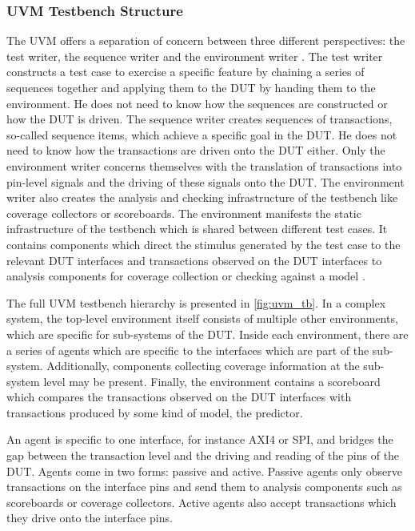 \documentclass[12pt]{report}
\begin{document}
\subsubsection{UVM Testbench Structure} %

The UVM offers a separation of concern between three different perspectives: the test writer, the sequence writer and
the environment writer \cite{sutherland2015uvm}. The test writer constructs a test case to exercise a specific
feature by chaining a series of sequences together and applying them to the DUT by handing them to the environment.
He does not need to know how the sequences are constructed or how the DUT is driven. The sequence writer creates
sequences of transactions, so-called sequence items, which achieve a specific goal in the DUT. He does not need to
know how the transactions are
driven onto the DUT either. Only the environment writer concerns themselves with the translation of transactions into
pin-level signals and the driving of these signals onto the DUT. The environment writer also creates the analysis and
checking infrastructure of the testbench like coverage collectors or scoreboards. The environment manifests the
static infrastructure of the testbench which is shared between different test cases. It contains components which
direct the stimulus generated by the test case to the relevant DUT interfaces and transactions observed on the DUT
interfaces to analysis components for coverage
collection or checking against a model \cite{sutherland2015uvm}.

The full UVM testbench hierarchy is presented in \ref{fig:uvm_tb}. In a complex system, the top-level environment
itself consists of
multiple other environments, which are specific for sub-systems of the DUT. Inside each environment, there are a
series of agents which are specific to the interfaces which are part of the sub-system. Additionally, components
collecting coverage information at the sub-system level may be present. Finally, the environment contains a
scoreboard which compares the transactions observed on the DUT interfaces with transactions produced by some kind of
model, the predictor.

An agent is specific to one interface, for instance AXI4 or SPI, and bridges the gap between the transaction level
and the driving and reading of the pins of the DUT. Agents come in two forms: passive and active. Passive agents only
observe transactions on the interface pins and send them to analysis components such as scoreboards or coverage
collectors. Active agents also accept transactions which they drive onto the interface pins.
\end{document}
